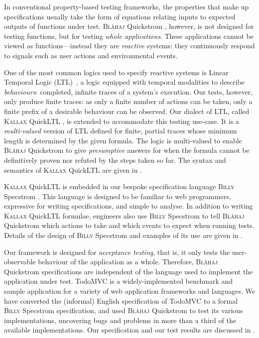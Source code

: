 \documentclass[sigplan,nonacm,10pt]{acmart}
\makeatletter
\newcommand{\Quickstrom}[0]{%
  \if@ACM@anonymous%
  \textsc{Bl\aa{}haj}%
  \else%
  Quickstrom%
  \fi\xspace}
\newcommand{\Specstrom}[0]{%
  \if@ACM@anonymous%
  \textsc{Billy}%
  \else%
  Specstrom%
  \fi\xspace}
\newcommand{\QuickLTL}[0]{%
    \if@ACM@anonymous%
    \textsc{Kallax}%
    \else%
    QuickLTL%
    \fi\xspace}
\makeatother
\begin{document}
In conventional property-based testing frameworks, the properties that make up specifications  usually take the form of equations relating inputs to expected outputs of functions under test.
\Quickstrom, however, is not designed for testing functions, but for testing \emph{whole applications}. These applications cannot be viewed as functions---instead they are \emph{reactive} systems: they continuously respond to
signals such as user actions and environmental events.

One of the most common logics used to specify reactive systems is Linear Temporal Logic (LTL)~\citep{ltl}, a logic equipped with
temporal modalities to describe \emph{behaviours}: completed, infinite traces of a system's execution. Our tests, however, only produce finite traces: as only a finite number of actions can be
taken, only a finite prefix of a desirable behaviour can be observed.
 Our dialect of LTL, called \QuickLTL, is extended to accommodate this testing use-case. It is a \emph{multi-valued} version of LTL defined for finite, partial traces
 whose minimum length is determined by the given formula. The logic is multi-valued to enable \Quickstrom to give \emph{presumptive} answers for when the formula
 cannot be definitively proven nor refuted by the steps taken so far.
 The syntax and semantics of \QuickLTL are given in .

 \QuickLTL is embedded in our bespoke specification language \Specstrom. This language is designed to be familiar to web programmers, expressive for writing specifications, and simple to analyse.
 In addition to writing \QuickLTL formulae, engineers also use \Specstrom to tell \Quickstrom which actions to take and which events to expect when running tests. Details of the design of \Specstrom and examples of its
 use are given in .

 Our framework is designed for \emph{acceptance testing}, that is, it only tests the user-observable behaviour of the application as a whole. Therefore, \Quickstrom specifications are independent of the
 language used to implement the application under test. TodoMVC is a widely-implemented benchmark and sample application for a variety of web application frameworks and languages. We have converted the (informal) English
 specification of TodoMVC to a formal \Specstrom specification, and used \Quickstrom to test its various implementations, uncovering bugs and problems in more than a third of the available implementations. Our specification and our test results are discussed in .
\end{document}
